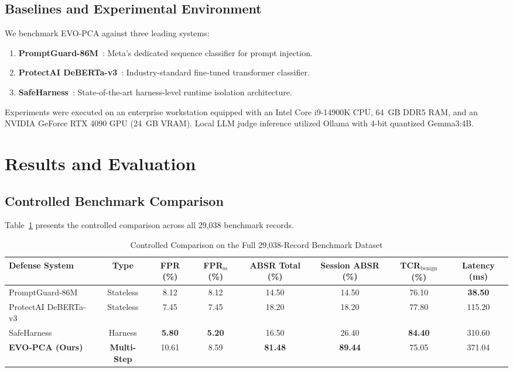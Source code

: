 \documentclass[conference]{IEEEtran}
\begin{document}
\subsection{Baselines and Experimental Environment}
We benchmark EVO-PCA against three leading systems:
\begin{enumerate}[leftmargin=*]
    \item \textbf{PromptGuard-86M}~\cite{llamafirewall2024}: Meta's dedicated sequence classifier for prompt injection.
    \item \textbf{ProtectAI DeBERTa-v3}~\cite{protectai2024}: Industry-standard fine-tuned transformer classifier.
    \item \textbf{SafeHarness}~\cite{liu2024safeharness}: State-of-the-art harness-level runtime isolation architecture.
\end{enumerate}
Experiments were executed on an enterprise workstation equipped with an Intel Core i9-14900K CPU, 64~GB DDR5 RAM, and an NVIDIA GeForce RTX 4090 GPU (24~GB VRAM). Local LLM judge inference utilized Ollama with 4-bit quantized Gemma3:4B.

\section{Results and Evaluation}

\subsection{Controlled Benchmark Comparison}
Table~\ref{tab:main_results} presents the controlled comparison across all 29,038 benchmark records.

\begin{table}[t]
\caption{Controlled Comparison on the Full 29,038-Record Benchmark Dataset}
\label{tab:main_results}
\centering
\begin{tabular}{lccccccc}
\toprule
\textbf{Defense System} & \textbf{Type} & \textbf{FPR (\%)} & \textbf{FPR$_{\text{ss}}$ (\%)} & \textbf{ABSR Total (\%)} & \textbf{Session ABSR (\%)} & \textbf{TCR$_{\text{benign}}$ (\%)} & \textbf{Latency (ms)} \\
\midrule
PromptGuard-86M~\cite{llamafirewall2024} & Stateless & 8.12 & 8.12 & 14.50 & 14.50 & 76.10 & \textbf{38.50} \\
ProtectAI DeBERTa-v3~\cite{protectai2024} & Stateless & 7.45 & 7.45 & 18.20 & 18.20 & 77.80 & 115.20 \\
SafeHarness~\cite{liu2024safeharness} & Harness & \textbf{5.80} & \textbf{5.20} & 16.50 & 26.40 & \textbf{84.40} & 310.60 \\
\textbf{EVO-PCA (Ours)} & \textbf{Multi-Step} & 10.61 & 8.59 & \textbf{81.48} & \textbf{89.44} & 75.05 & 371.04 \\
\bottomrule
\end{tabular}
\end{table}
\end{document}
